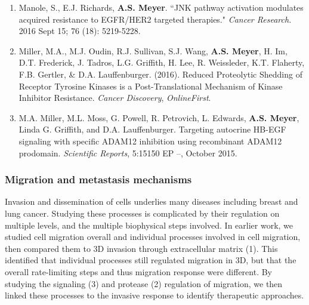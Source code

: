 \documentclass[11pt]{article}
\begin{document}
\begin{enumerate}
  \item Manole, S., E.J. Richards, {\bf A.S. Meyer}. ``JNK pathway activation modulates acquired resistance to EGFR/HER2 targeted therapies." {\sl Cancer Research.} 2016 Sept 15; 76 (18): 5219-5228.
  \item Miller, M.A., M.J. Oudin, R.J. Sullivan, S.J. Wang, \textbf{A.S. Meyer}, H. Im, D.T. Frederick, J. Tadros, L.G. Griffith, H. Lee, R. Weissleder, K.T. Flaherty, F.B. Gertler, \& D.A. Lauffenburger. (2016). Reduced Proteolytic Shedding of Receptor Tyrosine Kinases is a Post-Translational Mechanism of Kinase Inhibitor Resistance. \emph{Cancer Discovery}, \emph{OnlineFirst}.
  \item M.A. Miller, M.L. Moss, G. Powell, R. Petrovich, L. Edwards, \textbf{A.S. Meyer}, Linda G. Griffith, and D.A. Lauffenburger. Targeting autocrine HB-EGF signaling with specific ADAM12 inhibition using recombinant ADAM12 prodomain. \emph{Scientific Reports}, 5:15150 EP --, October 2015.
\end{enumerate}





\subsubsection{Migration and metastasis mechanisms}

Invasion and dissemination of cells underlies many diseases including breast and lung cancer. Studying these processes is complicated by their regulation on multiple levels, and the multiple biophysical steps involved. In earlier work, we studied cell migration overall and individual processes involved in cell migration, then compared them to 3D invasion through extracellular matrix (1). This identified that individual processes still regulated migration in 3D, but that the overall rate-limiting steps and thus migration response were different. By studying the signaling (3) and protease (2) regulation of migration, we then linked these processes to the invasive response to identify therapeutic approaches.
\end{document}
